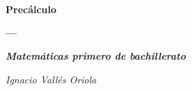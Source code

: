 \newpage




\newpage

$\,$

\newpage

$\,$

\vspace{1cm} 

$\,$




\begin{center}

\Huge{\textbf{Precálculo}}

\huge{\textbf{---}} 


\Large{\textbf{\textit{Matemáticas primero de bachillerato}}}

\vspace{10mm}


\vspace{2cm}
\begin{flushright}
	\normalsize{\emph{Ignacio Vallés Oriola}}
\end{flushright}


\end{center}





